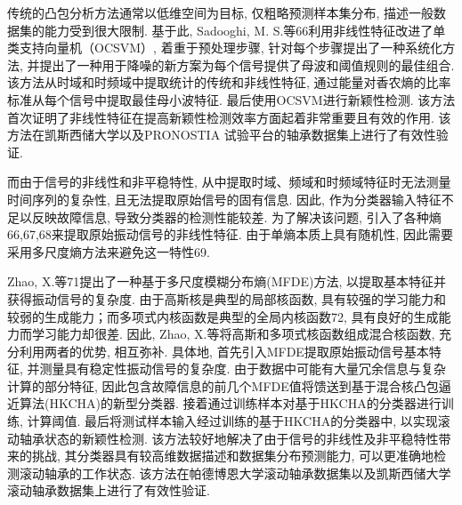 \documentclass{Style/aas}
\begin{document}
\begin{multicols}{2}
  传统的凸包分析方法通常以低维空间为目标, 仅粗略预测样本集分布, 描述一般数据集的能力受到很大限制. 基于此, Sadooghi, M. S.等66利用非线性特征改进了单类支持向量机（OCSVM）, 着重于预处理步骤, 针对每个步骤提出了一种系统化方法, 并提出了一种用于降噪的新方案为每个信号提供了母波和阈值规则的最佳组合. 该方法从时域和时频域中提取统计的传统和非线性特征, 通过能量对香农熵的比率标准从每个信号中提取最佳母小波特征. 最后使用OCSVM进行新颖性检测. 该方法首次证明了非线性特征在提高新颖性检测效率方面起着非常重要且有效的作用. 该方法在凯斯西储大学以及PRONOSTIA 试验平台的轴承数据集上进行了有效性验证.

  而由于信号的非线性和非平稳特性, 从中提取时域、频域和时频域特征时无法测量时间序列的复杂性, 且无法提取原始信号的固有信息. 因此, 作为分类器输入特征不足以反映故障信息, 导致分类器的检测性能较差. 为了解决该问题, 引入了各种熵66,67,68来提取原始振动信号的非线性特征. 由于单熵本质上具有随机性, 因此需要采用多尺度熵方法来避免这一特性69.

  Zhao, X.等71提出了一种基于多尺度模糊分布熵(MFDE)方法, 以提取基本特征并获得振动信号的复杂度. 由于高斯核是典型的局部核函数, 具有较强的学习能力和较弱的生成能力；而多项式内核函数是典型的全局内核函数72, 具有良好的生成能力而学习能力却很差. 因此, Zhao, X.等将高斯和多项式核函数组成混合核函数, 充分利用两者的优势, 相互弥补. 具体地, 首先引入MFDE提取原始振动信号基本特征, 并测量具有稳定性振动信号的复杂度. 由于数据中可能有大量冗余信息与复杂计算的部分特征, 因此包含故障信息的前几个MFDE值将馈送到基于混合核凸包逼近算法(HKCHA)的新型分类器. 接着通过训练样本对基于HKCHA的分类器进行训练, 计算阈值. 最后将测试样本输入经过训练的基于HKCHA的分类器中, 以实现滚动轴承状态的新颖性检测. 该方法较好地解决了由于信号的非线性及非平稳特性带来的挑战, 其分类器具有较高维数据描述和数据集分布预测能力, 可以更准确地检测滚动轴承的工作状态. 该方法在帕德博恩大学滚动轴承数据集以及凯斯西储大学滚动轴承数据集上进行了有效性验证.


\end{multicols}
\end{document}
